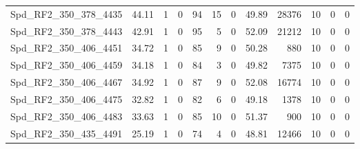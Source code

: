 \begin{longtable}[c]{@{}lrrrrrrrrrrr@{}}
Spd\_RF2\_350\_378\_4435     & 44.11                  & 1                       & 0                       & 94                     & 15                      & 0                       & 49.89                   & 28376                    & 10                       & 0                        & 0                        \\
Spd\_RF2\_350\_378\_4443     & 42.91                  & 1                       & 0                       & 95                     & 5                       & 0                       & 52.09                   & 21212                    & 10                       & 0                        & 0                        \\
Spd\_RF2\_350\_406\_4451     & 34.72                  & 1                       & 0                       & 85                     & 9                       & 0                       & 50.28                   & 880                      & 10                       & 0                        & 0                        \\
Spd\_RF2\_350\_406\_4459     & 34.18                  & 1                       & 0                       & 84                     & 3                       & 0                       & 49.82                   & 7375                     & 10                       & 0                        & 0                        \\
Spd\_RF2\_350\_406\_4467     & 34.92                  & 1                       & 0                       & 87                     & 9                       & 0                       & 52.08                   & 16774                    & 10                       & 0                        & 0                        \\
Spd\_RF2\_350\_406\_4475     & 32.82                  & 1                       & 0                       & 82                     & 6                       & 0                       & 49.18                   & 1378                     & 10                       & 0                        & 0                        \\
Spd\_RF2\_350\_406\_4483     & 33.63                  & 1                       & 0                       & 85                     & 10                      & 0                       & 51.37                   & 900                      & 10                       & 0                        & 0                        \\
Spd\_RF2\_350\_435\_4491     & 25.19                  & 1                       & 0                       & 74                     & 4                       & 0                       & 48.81                   & 12466                    & 10                       & 0                        & 0                        \\

\end{longtable}
